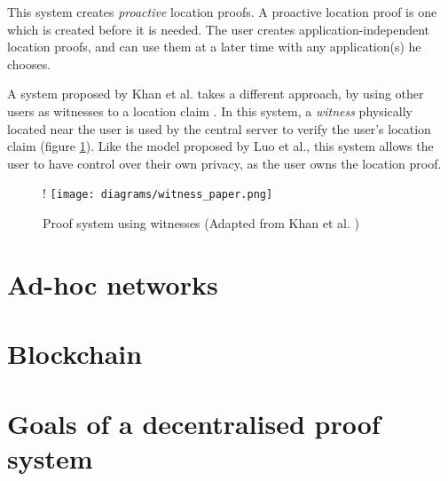 This system creates \textit{proactive} location proofs. A proactive location proof is one which is created before it is needed. The user creates application-independent location proofs, and can use them at a later time with any application(s) he chooses.

A system proposed by Khan et al. takes a different approach, by using other users as witnesses to a location claim \cite{khan}. In this system, a \textit{witness} physically located near the user is used by the central server to verify the user's location claim (figure \ref{fig:witness_paper}). Like the model proposed by Luo et al., this system allows the user to have control over their own privacy, as the user owns the location proof.

\begin{figure}[H]
\begin{center}
 {!} {\texttt{[image: diagrams/witness\_paper.png]}}
\caption{Proof system using witnesses (Adapted from Khan et al. \cite{khan})}
\label{fig:witness_paper}
\end{center}
\end{figure}

\section{Ad-hoc networks}

\section{Blockchain}

\section{Goals of a decentralised proof system}